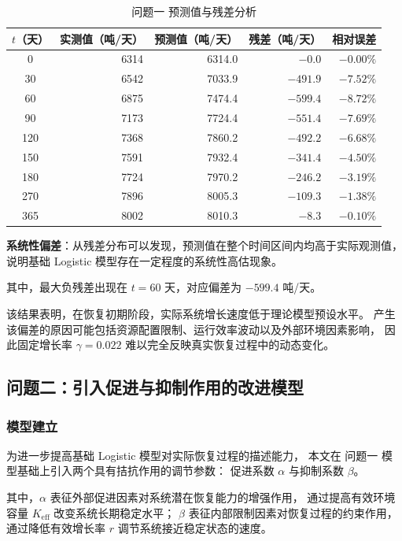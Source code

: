 \documentclass[12pt,a4paper]{ctexart}
\begin{document}
\begin{table}[htbp]
\centering

\begin{tabular}{crrrr}
\toprule
$t$（天） & 实测值（吨/天） & 预测值（吨/天） & 残差（吨/天） & 相对误差 \\
\midrule
0   & 6314 & 6314.0 & $-0.0$   & $-0.00\%$ \\
30  & 6542 & 7033.9 & $-491.9$ & $-7.52\%$ \\
60  & 6875 & 7474.4 & $-599.4$ & $-8.72\%$ \\
90  & 7173 & 7724.4 & $-551.4$ & $-7.69\%$ \\
120 & 7368 & 7860.2 & $-492.2$ & $-6.68\%$ \\
150 & 7591 & 7932.4 & $-341.4$ & $-4.50\%$ \\
180 & 7724 & 7970.2 & $-246.2$ & $-3.19\%$ \\
270 & 7896 & 8005.3 & $-109.3$ & $-1.38\%$ \\
365 & 8002 & 8010.3 & $-8.3$   & $-0.10\%$ \\
\bottomrule
\end{tabular}
\caption{问题一 预测值与残差分析}
\label{tab:q1_predictions}
\end{table}

\textbf{系统性偏差}：从残差分布可以发现，预测值在整个时间区间内均高于实际观测值，
说明基础 Logistic 模型存在一定程度的系统性高估现象。

其中，最大负残差出现在 $t=60$ 天，对应偏差为
$-599.4$ 吨/天。

该结果表明，在恢复初期阶段，实际系统增长速度低于理论模型预设水平。
产生该偏差的原因可能包括资源配置限制、运行效率波动以及外部环境因素影响，
因此固定增长率 $\gamma=0.022$ 难以完全反映真实恢复过程中的动态变化。

\subsection{问题二：引入促进与抑制作用的改进模型}

\subsubsection{模型建立}

为进一步提高基础 Logistic 模型对实际恢复过程的描述能力，
本文在 问题一 模型基础上引入两个具有拮抗作用的调节参数：
促进系数 $\alpha$ 与抑制系数 $\beta$。

其中，$\alpha$ 表征外部促进因素对系统潜在恢复能力的增强作用，
通过提高有效环境容量 $K_{\mathrm{eff}}$ 改变系统长期稳定水平；
$\beta$ 表征内部限制因素对恢复过程的约束作用，
通过降低有效增长率 $r$ 调节系统接近稳定状态的速度。
\end{document}
